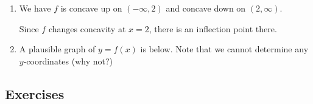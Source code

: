 \documentclass{ximera}
\begin{document}
\begin{example}
\begin{explanation}
\begin{enumerate}
\begin{image}
\begin{tikzpicture}[>=Latex, every node/.style={font=\normalsize}]
\end{tikzpicture}

\end{image}


\item   We have $f$ is concave up on $(-\infty, 2)$ and concave down on $(2, \infty)$.

Since $f$ changes concavity at $x=2$, there is an inflection point there.

\item   A plausible graph of $y = f(x)$  is below. Note that we cannot determine any $y$-coordinates (why not?)

\begin{center}
 \end{center}


\end{enumerate}
\end{explanation}
\end{example}





\newpage

\subsection{Exercises}

\closegraphsfile
\end{document}
